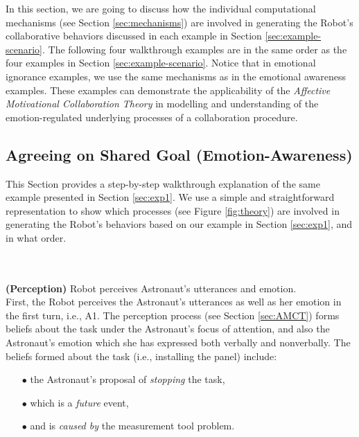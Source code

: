 In this section, we are going to discuss how the individual computational
mechanisms (see Section \ref{sec:mechanisms}) are involved in generating the
Robot's collaborative behaviors discussed in each example in Section
\ref{sec:example-scenario}. The following four walkthrough examples are in the
same order as the four examples in Section \ref{sec:example-scenario}. Notice
that in emotional ignorance examples, we use the same mechanisms as in the
emotional awareness examples. These examples can demonstrate the
applicability of the \textit{Affective Motivational Collaboration Theory} in
modelling and understanding of the emotion-regulated underlying processes of a
collaboration procedure.

\subsection{Agreeing on Shared Goal (Emotion-Awareness)}
\label{sec:wt-exp1}

This Section provides a step-by-step walkthrough explanation of the same
example presented in Section \ref{sec:exp1}. We use a simple and straightforward
representation to show which processes (see Figure \ref{fig:theory}) are
involved in generating the Robot's behaviors based on our example in Section
\ref{sec:exp1}, and in what order.\\

\noindent{}\\ \\

\noindent\item \textbf{(Perception)} Robot perceives Astronaut's utterances and
emotion.\\
  
First, the Robot perceives the Astronaut's utterances as well as her emotion in
the first turn, i.e., A1. The perception process (see Section \ref{sec:AMCT})
forms beliefs about the task under the Astronaut's focus of attention, and also
the Astronaut's emotion which she has expressed both verbally and nonverbally.
The beliefs formed about the task (i.e., installing the panel) include:

\begin{itemize}
  \item[$\bullet$] the Astronaut's proposal of \textit{stopping} the task,
  \item[$\bullet$] which is a \textit{future} event,
  \item[$\bullet$] and is \textit{caused by} the measurement tool problem.
\end{itemize}

